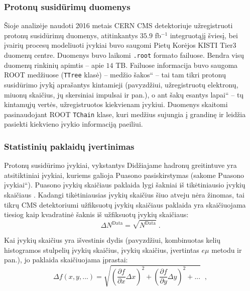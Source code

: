 \documentclass[a4paper, 12pt]{article}
\newcommand{\ttt}[1]{\texttt{#1}}
\newcommand{\ltq}[1]{{\quotedblbase{}#1\textquotedblleft{}}}
\newcommand{\invfb}{fb$^{-1}$}
\newlength\q
\begin{document}
\subsubsection{Protonų susidūrimų duomenys}

Šioje analizėje naudoti 2016 metais CERN CMS detektoriuje užregistruoti protonų susidūrimų duomenys, atitinkantys $35.9$ \invfb
integruotąjį šviesį, bei įvairių procesų modeliuoti įvykiai buvo saugomi Pietų Korėjos KISTI Tier3 duomenų centre.
Duomenys buvo laikomi \ttt{.root} formato failuose.
Bendra visų duomenų rinkinių apimtis -- apie $14$ TB.
Failuose informacija buvo saugoma ROOT medžiuose (\ttt{TTree} klasė) -- medžio \ltq{šakos} -- tai tam tikri protonų
susidūrimo įvykį aprašantys kintamieji (pavyzdžiui, užregistruotų elektronų, miuonų skaičius, jų skersiniai impulsai ir pan.),
o ant šakų esantys \ltq{lapai} -- tų kintamųjų vertės, užregistruotos kiekvienam įvykiui.
Duomenys skaitomi pasinaudojant ROOT \ttt{TChain} klase, kuri medžius sujungia į grandinę ir leidžia pasiekti kiekvieno įvykio
informaciją paeiliui.

\subsubsection{Statistinių paklaidų įvertinimas}
Protonų susidūrimo įvykiai, vykstantys Didžiajame hadronų greitintuve yra atsitiktiniai įvykiai, kuriems galioja Puasono pasiskirstymas (sakome \ltq{Puasono įvykiai}). Puasono įvykių skaičiaus paklaida lygi šakniai iš tikėtiniausio įvykių skaičiaus \cite{Poisson}. Kadangi tikėtiniausias įvykių skaičius šiuo atveju nėra žinomas, tai tikrų CMS detektoriumi užfiksuotų įvykių skaičiaus paklaida yra skaičiuojama tiesiog kaip kvadratinė šaknis iš užfiksuotų įvykių skaičiaus:
\begin{equation}
\Delta N^{\mathrm{Data}} = \sqrt{N^{\mathrm{Data}}} \; .
\label{eq:poisUnc}
\end{equation}

Kai įvykių skaičius yra išvestinis dydis (pavyzdžiui, kombinuotas kelių histogramos stulpelių įvykių skaičius, įvykių skaičius, įvertintas $e\mu$ metodu ir pan.), jo paklaida skaičiuojama įprastai:
\begin{equation}
\Delta f(x, y, ...) = \sqrt{\left(\frac{\partial f}{\partial x}\Delta x\right)^{2}+\left(\frac{\partial f}{\partial y}\Delta y\right)^{2}+...} \;\; \mathrm{,}
\label{eq:DerUnc}
\end{equation}
\end{document}
